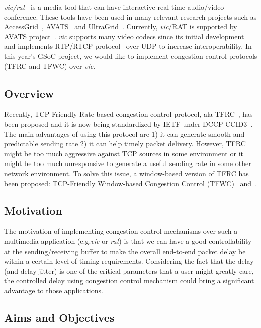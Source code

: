 
\emph{vic/rat}~\cite{MEDIATOOLS} is a media tool that can have interactive
real-time audio/video conference. These tools have been used in many relevant
research projects such as AccessGrid~\cite{ACCESSGRID}, AVATS~\cite{AVATS} and
UltraGrid~\cite{UltraGrid}. Currently, \emph{vic}/RAT is supported by AVATS
project~\cite{AVATS}. \emph{vic} supports many video codecs since its initial
development and implements RTP/RTCP protocol~\cite{RTP} over UDP to increase
interoperability. In this year's GSoC project, we would like to implement
congestion control protocols (TFRC and TFWC) over \emph{vic}. 

\subsection{\label{ssec:project_overview}Overview}

Recently, TCP-Friendly Rate-based congestion control protocol, ala
TFRC~\cite{FHPW00}, has been proposed and it is now being standardized by IETF
under DCCP CCID3~\cite{CCID3}. The main advantages of using this protocol are 1)
it can generate smooth and predictable sending rate 2) it can help timely packet
delivery. However, TFRC might be too much aggressive against TCP sources in some
environment or it might be too much unresponsive to generate a useful sending
rate in some other network environment. To solve this issue, a window-based
version of TFRC has been proposed: TCP-Friendly Window-based Congestion Control
(TFWC)~\cite{SH06} and~\cite{CH07}.

\subsection{\label{ssec:motivation}Motivation}

The motivation of implementing congestion control mechanisms over such a
multimedia application (e.g.\emph{vic} or \emph{rat}) is that we can have a good
controllability at the sending/receiving buffer to make the overall end-to-end
packet delay be within a certain level of timing requirements. Considering the
fact that the delay (and delay jitter) is one of the critical parameters that a
user might greatly care, the controlled delay using congestion control mechanism
could bring a significant advantage to those applications.

\subsection{\label{ssec:aims}Aims and Objectives}

